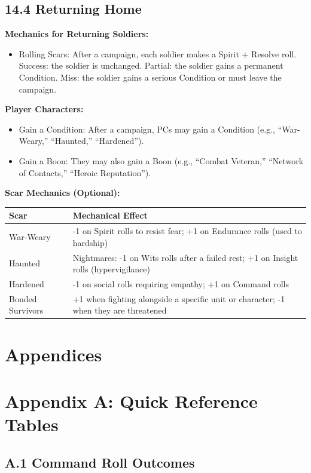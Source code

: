 \documentclass[11pt]{article}
\begin{document}
\subsection{14.4 Returning Home}

\textbf{Mechanics for Returning Soldiers:}
\begin{itemize}
  \item Rolling Scars: After a campaign, each soldier makes a Spirit + Resolve roll. Success: the soldier is unchanged. Partial: the soldier gains a permanent Condition. Miss: the soldier gains a serious Condition or must leave the campaign.
\end{itemize}

\textbf{Player Characters:}
\begin{itemize}
  \item Gain a Condition: After a campaign, PCs may gain a Condition (e.g., ``War-Weary,'' ``Haunted,'' ``Hardened'').
  \item Gain a Boon: They may also gain a Boon (e.g., ``Combat Veteran,'' ``Network of Contacts,'' ``Heroic Reputation'').
\end{itemize}

\textbf{Scar Mechanics (Optional):}
\begin{tabular}{|l|l|}
\hline
Scar & Mechanical Effect \\
\hline
War-Weary & -1 on Spirit rolls to resist fear; +1 on Endurance rolls (used to hardship) \\
\hline
Haunted & Nightmares: -1 on Wits rolls after a failed rest; +1 on Insight rolls (hypervigilance) \\
\hline
Hardened & -1 on social rolls requiring empathy; +1 on Command rolls \\
\hline
Bonded Survivors & +1 when fighting alongside a specific unit or character; -1 when they are threatened \\
\hline
\end{tabular}

\section{Appendices}

\section{Appendix A: Quick Reference Tables}

\subsection{A.1 Command Roll Outcomes}
\end{document}
